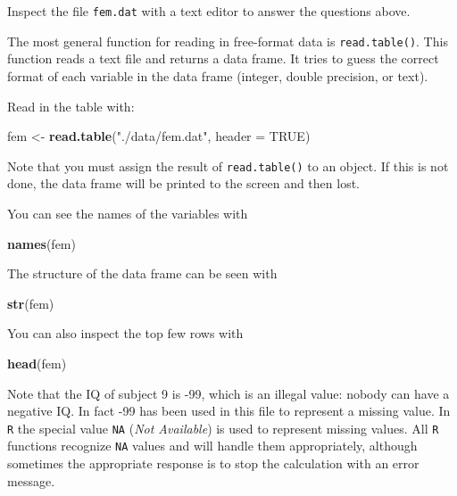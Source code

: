 \documentclass[
]{book}
\newenvironment{Shaded}{\begin{snugshade}}{\end{snugshade}}
\newcommand{\AttributeTok}[1]{\textcolor[rgb]{0.13,0.29,0.53}{#1}}
\newcommand{\ConstantTok}[1]{\textcolor[rgb]{0.56,0.35,0.01}{#1}}
\newcommand{\FunctionTok}[1]{\textcolor[rgb]{0.13,0.29,0.53}{\textbf{#1}}}
\newcommand{\NormalTok}[1]{#1}
\newcommand{\OtherTok}[1]{\textcolor[rgb]{0.56,0.35,0.01}{#1}}
\newcommand{\StringTok}[1]{\textcolor[rgb]{0.31,0.60,0.02}{#1}}
\begin{document}
Inspect the file \texttt{fem.dat} with a text editor to answer the
questions above.

The most general function for reading in free-format data is
\texttt{read.table()}. This function reads a text file and returns a
data frame. It tries to guess the correct format of each variable in
the data frame (integer, double precision, or text).

Read in the table with:

\begin{Shaded}
\begin{Highlighting}[]
\NormalTok{fem }\OtherTok{\textless{}{-}} \FunctionTok{read.table}\NormalTok{(}\StringTok{"./data/fem.dat"}\NormalTok{, }\AttributeTok{header =} \ConstantTok{TRUE}\NormalTok{)}
\end{Highlighting}
\end{Shaded}

Note that you must assign the result of \texttt{read.table()} to an
object. If this is not done, the data frame will be printed to the
screen and then lost.

You can see the names of the variables with

\begin{Shaded}
\begin{Highlighting}[]
\FunctionTok{names}\NormalTok{(fem)}
\end{Highlighting}
\end{Shaded}

The structure of the data frame can be seen with

\begin{Shaded}
\begin{Highlighting}[]
\FunctionTok{str}\NormalTok{(fem)}
\end{Highlighting}
\end{Shaded}

You can also inspect the top few rows with

\begin{Shaded}
\begin{Highlighting}[]
\FunctionTok{head}\NormalTok{(fem)}
\end{Highlighting}
\end{Shaded}

Note that the IQ of subject 9 is -99, which is an illegal value:
nobody can have a negative IQ. In fact -99 has been used in this file
to represent a missing value. In \texttt{R} the special value
\texttt{NA} (\emph{Not Available}) is used to represent missing values. All
\texttt{R} functions recognize \texttt{NA} values and will handle them
appropriately, although sometimes the appropriate response is to stop
the calculation with an error message.
\end{document}
